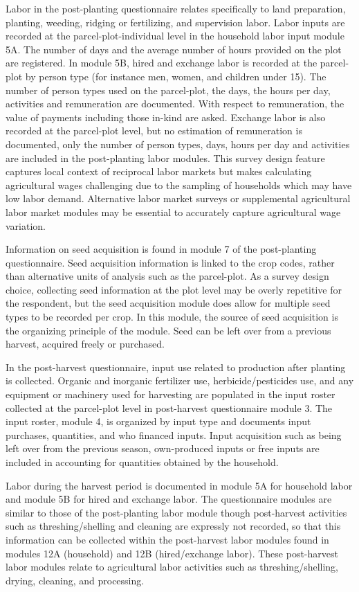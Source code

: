 \documentclass[
]{book}
\begin{document}
Labor in the post-planting questionnaire relates specifically to land preparation, planting, weeding, ridging or fertilizing, and supervision labor. Labor inputs are recorded at the parcel-plot-individual level in the household labor input module 5A. The number of days and the average number of hours provided on the plot are registered. In module 5B, hired and exchange labor is recorded at the parcel-plot by person type (for instance men, women, and children under 15). The number of person types used on the parcel-plot, the days, the hours per day, activities and remuneration are documented. With respect to remuneration, the value of payments including those in-kind are asked. Exchange labor is also recorded at the parcel-plot level, but no estimation of remuneration is documented, only the number of person types, days, hours per day and activities are included in the post-planting labor modules. This survey design feature captures local context of reciprocal labor markets but makes calculating agricultural wages challenging due to the sampling of households which may have low labor demand. Alternative labor market surveys or supplemental agricultural labor market modules may be essential to accurately capture agricultural wage variation.

Information on seed acquisition is found in module 7 of the post-planting questionnaire. Seed acquisition information is linked to the crop codes, rather than alternative units of analysis such as the parcel-plot. As a survey design choice, collecting seed information at the plot level may be overly repetitive for the respondent, but the seed acquisition module does allow for multiple seed types to be recorded per crop. In this module, the source of seed acquisition is the organizing principle of the module. Seed can be left over from a previous harvest, acquired freely or purchased.

In the post-harvest questionnaire, input use related to production after planting is collected. Organic and inorganic fertilizer use, herbicide/pesticides use, and any equipment or machinery used for harvesting are populated in the input roster collected at the parcel-plot level in post-harvest questionnaire module 3. The input roster, module 4, is organized by input type and documents input purchases, quantities, and who financed inputs. Input acquisition such as being left over from the previous season, own-produced inputs or free inputs are included in accounting for quantities obtained by the household.

Labor during the harvest period is documented in module 5A for household labor and module 5B for hired and exchange labor. The questionnaire modules are similar to those of the post-planting labor module though post-harvest activities such as threshing/shelling and cleaning are expressly not recorded, so that this information can be collected within the post-harvest labor modules found in modules 12A (household) and 12B (hired/exchange labor). These post-harvest labor modules relate to agricultural labor activities such as threshing/shelling, drying, cleaning, and processing.
\end{document}
